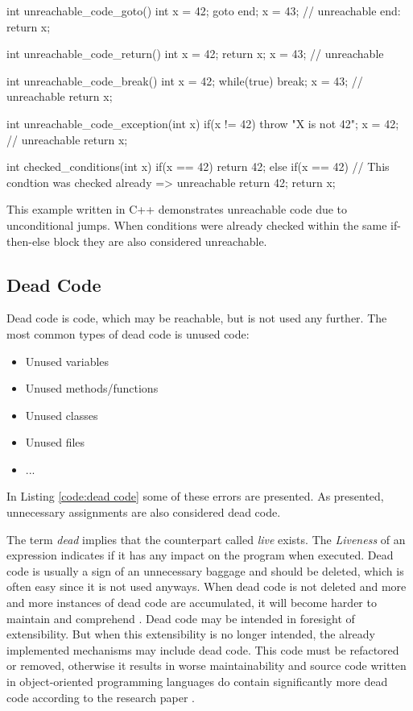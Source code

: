 \begin{program}
	\begin{CppCode}
		int unreachable_code_goto() {
			int x = 42;
			goto end;
			x = 43; // unreachable
			end: return x;
		}
		
		int unreachable_code_return() {
			int x = 42;
			return x;
			x = 43; // unreachable
		}
		
		int unreachable_code_break() {
			int x = 42;
			while(true) {
				break;
				x = 43; // unreachable
			}
			return x;
		}
		
		int unreachable_code_exception(int x) {
			if(x != 42) {
				throw "X is not 42";
				x = 42; // unreachable
			}
			return x;
		}
		
		int checked_conditions(int x) {
			if(x == 42) {
				return 42;
			} else if(x == 42) { // This condtion was checked already => unreachable
				return 42;
			}
			return x;
	}\end{CppCode}
	\caption{This example written in C++ demonstrates unreachable code due to unconditional jumps. When conditions were already checked within the same if-then-else block they are also considered unreachable.}
	\label{code:unconditional unreachable code}
\end{program}


\subsection{Dead Code}
\label{sub:dead code}

Dead code is code, which may be reachable, but is not used any further.
The most common types of dead code is unused code:
\begin{itemize}
	\item Unused variables \cite{Prahofer_2012}
	\item Unused methods/functions \cite{Romano_2016}
	\item Unused classes
	\item Unused files \cite{Boomsma_2012}
	\item ...
\end{itemize}
In Listing \ref{code:dead code} some of these errors are presented. As presented, unnecessary assignments are also considered dead code.


The term \emph{dead} implies that the counterpart called \emph{live} exists. 
The \emph{Liveness} of an expression indicates if it has any impact on the program when executed.
Dead code is usually a sign of an unnecessary baggage and should be deleted, which is often easy since it is not used anyways.
When dead code is not deleted and more and more instances of dead code are accumulated, it will become harder to maintain and comprehend \cite{Romano_2020}. Dead code may be intended in foresight of extensibility. But when this extensibility is no longer intended, the already implemented mechanisms may include dead code. This code must be refactored or removed, otherwise it results in worse maintainability and 
source code written in object-oriented programming languages do contain significantly more dead code according to the research paper \cite{Srivastava_1992}.


